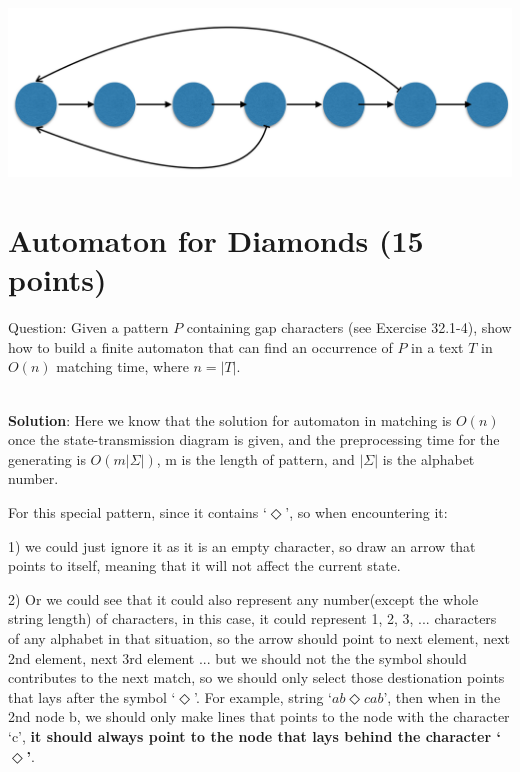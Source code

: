 \documentclass{article}
\begin{document}
\begin{center}
\includegraphics[scale=0.3]{hw7_2.png}
\end{center}


\section{Automaton for Diamonds (15 points)}
Question: Given a pattern $P$ containing gap characters (see Exercise 32.1-4), show how to build a finite automaton that can find an occurrence of $P$ in a text $T$ in $O(n)$ matching time, where $n = |T|$.

~\\
\textbf{Solution}:\newline
\indent Here we know that the solution for automaton in matching is $O(n)$ once the state-transmission diagram is given, and the preprocessing time for the generating is $O(m|\Sigma|)$, m is the length of pattern, and $|\Sigma|$ is the alphabet number.

For this special pattern, since it contains `$\Diamond$', so when encountering it: 

1) we could just ignore it as it is an empty character, so draw an arrow that points to itself, meaning that it will not affect the current state.

2) Or we could see that it could also represent any number(except the whole string length) of characters, in this case, it could represent 1, 2, 3, ... characters of any alphabet in that situation, so the arrow should point to next element, next 2nd element, next 3rd element ... but we should not the the symbol should contributes to the next match, so we should only select those destionation points that lays after the symbol `$\Diamond$'. For example, string `$ab\Diamond{}cab$', then when in the 2nd node b, we should only make lines that points to the node with the character `c', \textbf{it should always point to the node that lays behind the character `$\Diamond$'}.
\end{document}
